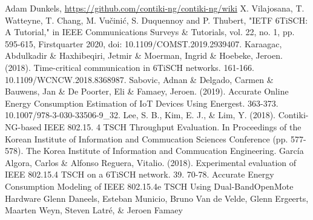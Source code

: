 \documentclass[conference]{IEEEtran}
\begin{document}
\begin{thebibliography}{00}
 Adam Dunkels, \url {https://github.com/contiki-ng/contiki-ng/wiki}
 X. Vilajosana, T. Watteyne, T. Chang, M. Vučinić, S. Duquennoy and P. Thubert, "IETF 6TiSCH: A Tutorial," in IEEE Communications Surveys \& Tutorials, vol. 22, no. 1, pp. 595-615, Firstquarter 2020, doi: 10.1109/COMST.2019.2939407.
 Karaagac, Abdulkadir \& Haxhibeqiri, Jetmir \& Moerman, Ingrid \& Hoebeke, Jeroen. (2018). Time-critical communication in 6TiSCH networks. 161-166. 10.1109/WCNCW.2018.8368987. 
 Sabovic, Adnan \& Delgado, Carmen \& Bauwens, Jan \& De Poorter, Eli \& Famaey, Jeroen. (2019). Accurate Online Energy Consumption Estimation of IoT Devices Using Energest. 363-373. 10.1007/978-3-030-33506-9\_32. 
 Lee, S. B., Kim, E. J., \& Lim, Y. (2018). Contiki-NG-based IEEE 802.15. 4 TSCH Throughput Evaluation. In Proceedings of the Korean Institute of Information and Commucation Sciences Conference (pp. 577-578). The Korea Institute of Information and Commucation Engineering.
 García Algora, Carlos \& Alfonso Reguera, Vitalio. (2018). Experimental evaluation of IEEE 802.15.4 TSCH on a 6TiSCH network. 39. 70-78.
 Accurate Energy Consumption Modeling of IEEE 802.15.4e TSCH Using Dual-BandOpenMote Hardware
Glenn Daneels, Esteban Municio, Bruno Van de Velde, Glenn Ergeerts, Maarten Weyn, Steven Latré, \& Jeroen Famaey

\end{thebibliography}
\end{document}
